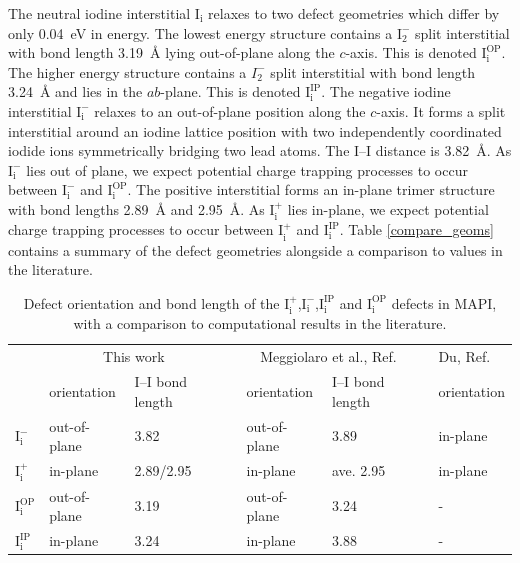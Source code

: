 The neutral iodine interstitial $\mathrm{I}_\mathrm{i}$ relaxes to two defect geometries which differ by only \SI{0.04}{\electronvolt} in energy. The lowest energy structure contains a $\mathrm{I}_2^-$ split interstitial with bond length \SI{3.19}{\angstrom} lying out-of-plane along the $c$-axis. This is denoted $\mathrm{I}_\mathrm{i}^{\textrm{OP}}$. The higher energy structure contains a $I_2^-$ split interstitial with bond length \SI{3.24}{\angstrom} and lies in the $ab$-plane. This is denoted $\mathrm{I}_\mathrm{i}^{\textrm{IP}}$. The negative iodine interstitial 
$\mathrm{I}_\mathrm{i}^-$ relaxes to an out-of-plane position along the $c$-axis. It forms a split interstitial around an iodine lattice position with two independently coordinated iodide ions symmetrically bridging two lead atoms. The I--I distance is \SI{3.82}{\angstrom}. As $\mathrm{I}_\mathrm{i}^-$ lies out of plane, we expect potential charge trapping processes to occur between $\mathrm{I}_\mathrm{i}^-$ and $\mathrm{I}_\mathrm{i}^{\textrm{OP}}$. The positive interstitial forms an in-plane trimer structure with bond lengths \SI{2.89}{\angstrom} and \SI{2.95}{\angstrom}. As $\mathrm{I}_\mathrm{i}^+$ lies in-plane, we expect potential charge trapping processes to occur between $\mathrm{I}_\mathrm{i}^+$ and $\mathrm{I}_\mathrm{i}^{\textrm{IP}}$.
Table \ref{compare_geoms} contains a summary of the defect geometries alongside a comparison to values in the literature.

\begin{table}[h!]\centering
\begin{tabular}{llllllll}\toprule
\phantom{abcd}&\multicolumn{2}{c}{This work} &\phantom{a} &\multicolumn{2}{c}{Meggiolaro et al., Ref. \cite{Meggiolaro2018}}&\phantom{a} & Du, Ref. \cite{Du2015} \\
\cline{2-3} \cline{5-6} \cline{8-8}
& orientation & I--I bond length && orientation & I--I bond length && orientation \\  
\midrule
$\mathrm{I}_\mathrm{i}^-$ &  out-of-plane & 3.82  &&  out-of-plane & 3.89 && in-plane \\
$\mathrm{I}_\mathrm{i}^+$ & in-plane & 2.89/2.95 && in-plane & ave. 2.95 && in-plane \\
$\mathrm{I}_\mathrm{i}^\mathrm{OP}$ & out-of-plane & 3.19 && out-of-plane & 3.24 && - \\
$\mathrm{I}_\mathrm{i}^\mathrm{IP}$ & in-plane & 3.24 && in-plane & 3.88 && - \\
\end{tabular} 
\caption[Defect orientation and bond length of the $\mathrm{I}_\mathrm{i}^+$,$\mathrm{I}_\mathrm{i}^-$,$\mathrm{I}_\mathrm{i}^\mathrm{IP}$ and $\mathrm{I}_\mathrm{i}^\mathrm{OP}$ defects in MAPI]{Defect orientation and bond length of the $\mathrm{I}_\mathrm{i}^+$,$\mathrm{I}_\mathrm{i}^-$,$\mathrm{I}_\mathrm{i}^\mathrm{IP}$ and $\mathrm{I}_\mathrm{i}^\mathrm{OP}$ defects in MAPI, with a comparison to computational results in the literature. }
\end{table}

